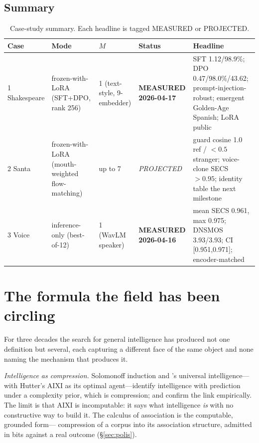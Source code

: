 \documentclass[10pt,twocolumn]{article}
\begin{document}
\subsection{Summary}
\begin{table}[t]
\centering
\caption{Case-study summary. Each headline is tagged MEASURED or PROJECTED.}
\label{tab:cases}
\small
\begin{tabular}{@{}p{1.7cm}p{3.1cm}p{1.5cm}p{2.6cm}p{5.2cm}@{}}
\toprule
\textbf{Case} & \textbf{Mode} & \textbf{$M$} & \textbf{Status} & \textbf{Headline}\\
\midrule
1 Shakespeare & frozen-with-LoRA (SFT+DPO, rank 256) & 1 (text-style, 9-embedder)
& \textbf{MEASURED 2026-04-17} & SFT 1.12/98.9\%; DPO 0.47/98.0\%/43.62;
prompt-injection-robust; emergent Golden-Age Spanish; LoRA public\\
2 Santa & frozen-with-LoRA (mouth-weighted flow-matching) & up to 7 &
\emph{PROJECTED} & guard cosine 1.0 ref / ${<}0.5$ stranger; voice-clone SECS
${>}0.95$; identity table the next milestone\\
3 Voice & inference-only (best-of-12) & 1 (WavLM speaker) &
\textbf{MEASURED 2026-04-16} & mean SECS 0.961, max 0.975; DNSMOS 3.93/3.93;
CI [0.951,0.971]; encoder-matched\\
\bottomrule
\end{tabular}
\end{table}

\section{The formula the field has been circling}
\label{sec:agi}
For three decades the search for general intelligence has produced not one
definition but several, each capturing a different face of the same object and
none naming the mechanism that produces it.

\emph{Intelligence as compression.} Solomonoff induction and
\citet{legg2007universal}'s universal intelligence---with Hutter's AIXI as its
optimal agent---identify intelligence with prediction under a complexity prior,
which is compression; \citet{deletang2024compression} and
\citet{huang2024compression} confirm the link empirically. The limit is that AIXI
is incomputable: it says what intelligence \emph{is} with no constructive way to
build it. The calculus of association is the computable, grounded form---
compression of a corpus into its association structure, admitted in bits against a
real outcome (\S\ref{sec:polis}).
\end{document}

